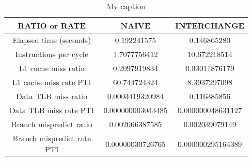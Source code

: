 \begin{table}[]
\centering
\caption{My caption}
\label{my-label}
\begin{tabular}{|c|c|c|}
\hline
\textbf{RATIO or RATE}        & \textbf{NAIVE}    & \textbf{INTERCHANGE} \\ \hline
Elapsed time (seconds)     & 0.192241575       & 0.146865280          \\ \hline
Instructions per cycle     & 1.7077756412      & 10.672218514         \\ \hline
L1 cache miss ratio        & 0.2097919834      & 0.03011876179        \\ \hline
L1 cache miss rate PTI     & 60.744724324      & 8.3937297098         \\ \hline
Data TLB miss ratio        & 0.0003419320984   & 0.116385856          \\ \hline
Data TLB miss rate PTI     & 0.000000003043485 & 0.000000048631127    \\ \hline
Branch mispredict ratio    & 0.002066387585    & 0.002039079149       \\ \hline
Branch mispredict rate PTI & 0.00000030726765  & 0.000000295164389    \\ \hline
\end{tabular}
\end{table}
